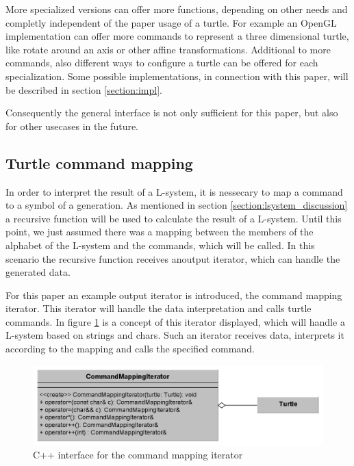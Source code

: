\documentclass[english]{cpp-hmwk}
\begin{document}
\medskip
\noindent More specialized versions can offer more functions, depending on other needs and completly independent of the paper usage of a turtle. For example an OpenGL implementation can offer more commands to represent a three dimensional turtle, like rotate around an axis or other affine transformations. Additional to more commands, also different ways to configure a turtle can be offered for each specialization. Some possible implementations, in connection with this paper, will be described in section \ref{section:impl}.

Consequently the general interface is not only sufficient for this paper, but also for other usecases in the future.

\subsection{Turtle command mapping}
\label{section:turtle_mapping}
In order to interpret the result of a L-system, it is nessecary to map a command to a symbol of a generation. As mentioned in section \ref{section:lsystem_discussion} a recursive function will be used to calculate the result of a L-system. Until this point, we just assumed there was a mapping between the members of the alphabet of the L-system and the commands, which will be called. In this scenario the recursive function receives anoutput  iterator, which can handle the generated data. 

For this paper an example output iterator is introduced, the command mapping iterator. This iterator will handle the data interpretation and calls turtle commands. In figure \ref{figure:if_command_map} is a concept of this iterator displayed, which will handle a L-system based on strings and chars. Such an iterator receives data, interprets it according to the mapping and calls the specified command.

\begin{figure}[h!]
	\centering
	\includegraphics[width=1\columnwidth]{../graphs/class_command_mapping_iterator.png}
	\caption{C++ interface for the command mapping iterator}
	\label{figure:if_command_map}
\end{figure}
\end{document}

